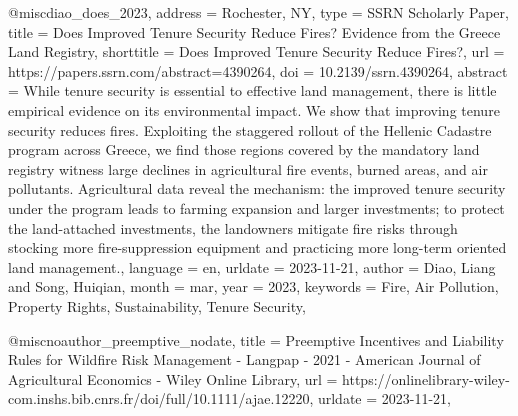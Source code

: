 {{{@misc{diao_does_2023,
	address = {Rochester, NY},
	type = {{SSRN} {Scholarly} {Paper}},
	title = {Does {Improved} {Tenure} {Security} {Reduce} {Fires}? {Evidence} from the {Greece} {Land} {Registry}},
	shorttitle = {Does {Improved} {Tenure} {Security} {Reduce} {Fires}?},
	url = {https://papers.ssrn.com/abstract=4390264},
	doi = {10.2139/ssrn.4390264},
	abstract = {While tenure security is essential to effective land management, there is little empirical evidence on its environmental impact. We show that improving tenure security reduces fires. Exploiting the staggered rollout of the Hellenic Cadastre program across Greece, we find those regions covered by the mandatory land registry witness large declines in agricultural fire events, burned areas, and air pollutants. Agricultural data reveal the mechanism: the improved tenure security under the program leads to farming expansion and larger investments; to protect the land-attached investments, the landowners mitigate fire risks through stocking more fire-suppression equipment and practicing more long-term oriented land management.},
	language = {en},
	urldate = {2023-11-21},
	author = {Diao, Liang and Song, Huiqian},
	month = mar,
	year = {2023},
	keywords = {Fire, Air Pollution, Property Rights, Sustainability, Tenure Security},
}

@misc{noauthor_preemptive_nodate,
	title = {Preemptive {Incentives} and {Liability} {Rules} for {Wildfire} {Risk} {Management} - {Langpap} - 2021 - {American} {Journal} of {Agricultural} {Economics} - {Wiley} {Online} {Library}},
	url = {https://onlinelibrary-wiley-com.inshs.bib.cnrs.fr/doi/full/10.1111/ajae.12220},
	urldate = {2023-11-21},
}

}}}
